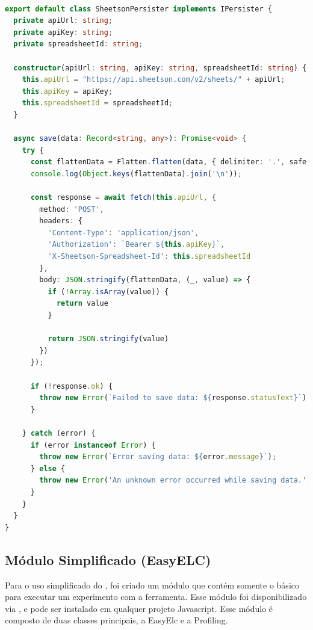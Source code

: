\documentclass[12pt]{tcc}
\begin{document}
\begin{lstlisting}[label={lst:sheetson_class}, caption={Implementação da classe responsável pela persistência dos dados usando o Sheetson.}, language=TypeScript, breaklines=true]

export default class SheetsonPersister implements IPersister {
  private apiUrl: string;
  private apiKey: string;
  private spreadsheetId: string;

  constructor(apiUrl: string, apiKey: string, spreadsheetId: string) {
    this.apiUrl = "https://api.sheetson.com/v2/sheets/" + apiUrl;
    this.apiKey = apiKey;
    this.spreadsheetId = spreadsheetId;
  }

  async save(data: Record<string, any>): Promise<void> {
    try {
      const flattenData = Flatten.flatten(data, { delimiter: '.', safe: true });
      console.log(Object.keys(flattenData).join('\n'));
      
      const response = await fetch(this.apiUrl, {
        method: 'POST',
        headers: {
          'Content-Type': 'application/json',
          'Authorization': `Bearer ${this.apiKey}`,
          'X-Sheetson-Spreadsheet-Id': this.spreadsheetId
        },
        body: JSON.stringify(flattenData, (_, value) => {
          if (!Array.isArray(value)) {
            return value
          }

          return JSON.stringify(value)
        })
      });

      if (!response.ok) {
        throw new Error(`Failed to save data: ${response.statusText}`);
      }

    } catch (error) {
      if (error instanceof Error) {
        throw new Error(`Error saving data: ${error.message}`);
      } else {
        throw new Error('An unknown error occurred while saving data.');
      }
    }
  }
}
\end{lstlisting}


\subsection{Módulo Simplificado (EasyELC)}


Para o uso simplificado do , foi criado um módulo que contém somente o básico para executar um experimento com a ferramenta. Esse módulo foi disponibilizado via , e pode ser instalado em qualquer projeto Javascript. Esse módulo é composto de duas classes principais, a EasyElc e a Profiling.
\end{document}
